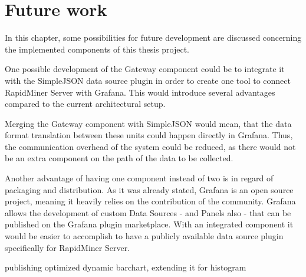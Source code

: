 \chapter{Future work}

In this chapter, some possibilities for future development are discussed concerning the implemented components of this thesis project.

One possible development of the Gateway component could be to integrate it with the SimpleJSON data source plugin in order to create one tool to connect RapidMiner Server with Grafana. This would introduce several advantages compared to the current architectural setup.

Merging the Gateway component with SimpleJSON would mean, that the data format translation between these units could happen directly in Grafana. Thus, the communication overhead of the system could be reduced, as there would not be an extra component on the path of the data to be collected.



Another advantage of having one component instead of two is in regard of packaging and distribution. As it was already stated, Grafana is an open source project, meaning it heavily relies on the contribution of the community. Grafana allows the development of custom Data Sources - and Panels also - that can be published on the Grafana plugin marketplace. With an integrated component it would be easier to accomplish to have a publicly available data source plugin specifically for RapidMiner Server. 

\begin{center}
	\begin{itemize}
		publishing optimized dynamic barchart, extending it for histogram
	\end{itemize}
\end{center}